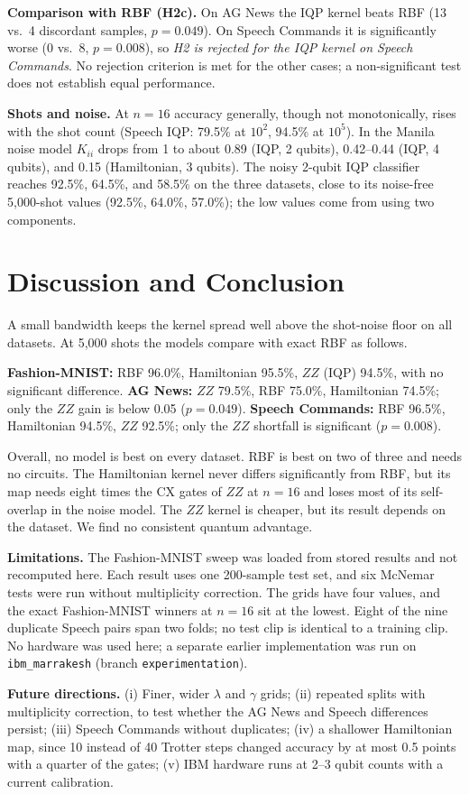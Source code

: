 \documentclass[conference]{IEEEtran}
\begin{document}
\textbf{Comparison with RBF (H2c).} On AG News the IQP kernel beats RBF (13 vs.\ 4 discordant samples, $p=0.049$). On Speech Commands it is significantly worse (0 vs.\ 8, $p=0.008$), so \emph{H2 is rejected for the IQP kernel on Speech Commands}. No rejection criterion is met for the other cases; a non-significant test does not establish equal performance.

\textbf{Shots and noise.} At $n=16$ accuracy generally, though not monotonically, rises with the shot count (Speech IQP: 79.5\% at $10^{2}$, 94.5\% at $10^{5}$). In the Manila noise model $K_{ii}$ drops from 1 to about 0.89 (IQP, 2 qubits), 0.42--0.44 (IQP, 4 qubits), and 0.15 (Hamiltonian, 3 qubits). The noisy 2-qubit IQP classifier reaches 92.5\%, 64.5\%, and 58.5\% on the three datasets, close to its noise-free 5{,}000-shot values (92.5\%, 64.0\%, 57.0\%); the low values come from using two components.

\section{Discussion and Conclusion}
A small bandwidth keeps the kernel spread well above the shot-noise floor on all datasets. At 5{,}000 shots the models compare with exact RBF as follows.

\textbf{Fashion-MNIST:} RBF 96.0\%, Hamiltonian 95.5\%, $ZZ$ (IQP) 94.5\%, with no significant difference. \textbf{AG News:} $ZZ$ 79.5\%, RBF 75.0\%, Hamiltonian 74.5\%; only the $ZZ$ gain is below 0.05 ($p=0.049$). \textbf{Speech Commands:} RBF 96.5\%, Hamiltonian 94.5\%, $ZZ$ 92.5\%; only the $ZZ$ shortfall is significant ($p=0.008$).

Overall, no model is best on every dataset. RBF is best on two of three and needs no circuits. The Hamiltonian kernel never differs significantly from RBF, but its map needs eight times the CX gates of $ZZ$ at $n=16$ and loses most of its self-overlap in the noise model. The $ZZ$ kernel is cheaper, but its result depends on the dataset. We find no consistent quantum advantage.

\textbf{Limitations.} The Fashion-MNIST sweep was loaded from stored results and not recomputed here. Each result uses one 200-sample test set, and six McNemar tests were run without multiplicity correction. The grids have four values, and the exact Fashion-MNIST winners at $n=16$ sit at the lowest. Eight of the nine duplicate Speech pairs span two folds; no test clip is identical to a training clip. No hardware was used here; a separate earlier implementation was run on \texttt{ibm\_marrakesh} (branch \texttt{experimentation}).

\textbf{Future directions.} (i) Finer, wider $\lambda$ and $\gamma$ grids; (ii) repeated splits with multiplicity correction, to test whether the AG News and Speech differences persist; (iii) Speech Commands without duplicates; (iv) a shallower Hamiltonian map, since 10 instead of 40 Trotter steps changed accuracy by at most 0.5 points with a quarter of the gates; (v) IBM hardware runs at 2--3 qubit counts with a current calibration.



\end{document}
